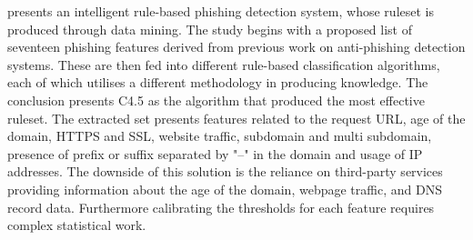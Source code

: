 \cite{Rami_Mohammad} presents an intelligent rule-based phishing detection system, whose ruleset is produced through data mining. The study begins with a proposed list of seventeen phishing features derived from previous work on anti-phishing detection systems. These are then fed into different rule-based classification algorithms, each of which utilises a different methodology in producing knowledge. The conclusion presents C4.5 \citep{Quinlan} as the algorithm that produced the most effective ruleset. The extracted set presents features related to the request URL, age of the domain, HTTPS and SSL, website traffic, subdomain and multi subdomain, presence of prefix or suffix separated by "--" in the domain and usage of IP addresses. The downside of this solution is the reliance on third-party services providing information about the age of the domain, webpage traffic, and DNS record data. Furthermore calibrating the thresholds for each feature requires complex statistical work.

